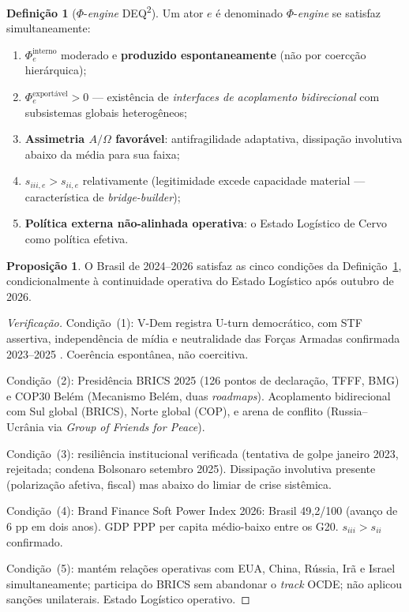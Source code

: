 \documentclass[12pt]{article}
\theoremstyle{definition}
\newtheorem{definition}{Defini\c{c}\~{a}o}
\newtheorem{proposition}{Proposi\c{c}\~{a}o}
\theoremstyle{remark}
\providecommand{\tightlist}{\setlength{\itemsep}{0pt}\setlength{\parskip}{0pt}}
\begin{document}
\begin{definition}[\(\Phi\)-\textit{engine} DEQ\textsuperscript{2}]
\label{def:phi-engine}
Um ator \(e\) \'{e} denominado \(\Phi\)-\textit{engine} se satisfaz simultaneamente:
\begin{enumerate}\tightlist
\item \(\Phi_e^{\text{interno}}\) moderado e \textbf{produzido espontaneamente} (n\~{a}o por coerc\c{c}\~{a}o hier\'{a}rquica);
\item \(\Phi_e^{\text{exportável}} > 0\) --- exist\^{e}ncia de \textit{interfaces de acoplamento bidirecional} com subsistemas globais heterog\^{e}neos;
\item \textbf{Assimetria \(A/\Omega\) favor\'{a}vel}: antifragilidade adaptativa, dissipa\c{c}\~{a}o involutiva abaixo da m\'{e}dia para sua faixa;
\item \(s_{iii,e} > s_{ii,e}\) relativamente (legitimidade excede capacidade material --- caracter\'{i}stica de \textit{bridge-builder});
\item \textbf{Pol\'{i}tica externa n\~{a}o-alinhada operativa}: o Estado Log\'{i}stico de Cervo como pol\'{i}tica efetiva.
\end{enumerate}
\end{definition}

\begin{proposition}\label{prop:brasil}
O Brasil de 2024--2026 satisfaz as cinco condi\c{c}\~{o}es da Defini\c{c}\~{a}o~\ref{def:phi-engine}, condicionalmente \`{a} continuidade operativa do Estado Log\'{i}stico após outubro de 2026.
\end{proposition}

\begin{proof}[Verifica\c{c}\~{a}o]
Condi\c{c}\~{a}o~(1): V-Dem registra U-turn democr\'{a}tico, com STF assertiva, independ\^{e}ncia de m\'{i}dia e neutralidade das For\c{c}as Armadas confirmada 2023--2025 \citep{vdem2026}. Coer\^{e}ncia espontânea, n\~{a}o coercitiva.

Condi\c{c}\~{a}o~(2): Presid\^{e}ncia BRICS 2025 (126 pontos de declara\c{c}\~{a}o, TFFF, BMG) e COP30 Bel\'{e}m (Mecanismo Bel\'{e}m, duas \textit{roadmaps}). Acoplamento bidirecional com Sul global (BRICS), Norte global (COP), e arena de conflito (Russia--Ucrânia via \textit{Group of Friends for Peace}).

Condi\c{c}\~{a}o~(3): resili\^{e}ncia institucional verificada (tentativa de golpe janeiro 2023, rejeitada; condena Bolsonaro setembro 2025). Dissipa\c{c}\~{a}o involutiva presente (polariza\c{c}\~{a}o afetiva, fiscal) mas abaixo do limiar de crise sistêmica.

Condi\c{c}\~{a}o~(4): Brand Finance Soft Power Index 2026: Brasil 49,2/100 (avan\c{c}o de 6 pp em dois anos). GDP PPP per capita médio-baixo entre os G20. \(s_{iii} > s_{ii}\) confirmado.

Condi\c{c}\~{a}o~(5): mantém rela\c{c}\~{o}es operativas com EUA, China, R\'{u}ssia, Ir\~{a} e Israel simultaneamente; participa do BRICS sem abandonar o \textit{track} OCDE; n\~{a}o aplicou san\c{c}\~{o}es unilaterais. Estado Log\'{i}stico operativo.
\end{proof}
\end{document}
